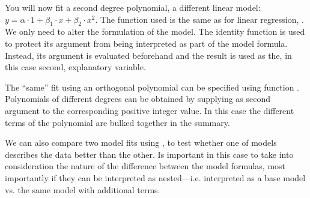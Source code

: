 \documentclass[krantz2]{krantz}\usepackage{knitr}%
\begin{document}
\begin{playground}
You will now fit a second degree polynomial, a different linear model: $y = \alpha \cdot 1 + \beta_1 \cdot x + \beta_2 \cdot x^2$. The function used is the same as for linear regression, . We only need to alter the formulation of the model. The identity function  is used to protect its argument from being interpreted as part of the model formula. Instead, its argument is evaluated beforehand and the result is used as the, in this case second, explanatory variable.

\begin{knitrout}\footnotesize
{}\color{fgcolor}\begin{kframe}
\begin{alltt}
 \hlkwb{<-}  \hlopt{~}  \hlopt{+} \hlopt{^}\hlstd{),}  
  \hlstd{=} \hlstd{)}
\end{alltt}
\end{kframe}
\end{knitrout}

The ``same'' fit using an orthogonal polynomial can be specified using function . Polynomials of different degrees can be obtained by supplying as second argument to  the corresponding positive integer value. In this case the different terms of the polynomial are bulked together in the summary.

\begin{knitrout}\footnotesize
{}\color{fgcolor}\begin{kframe}
\begin{alltt}
 \hlkwb{<-}  \hlopt{~}  \hlstd{),} 
\end{alltt}
\end{kframe}
\end{knitrout}

We can also compare two model fits using , to test whether one of models describes the data better than the other. Is important in this case to take into consideration the nature of the difference between the model formulas, most importantly if they can be interpreted as nested---i.e. interpreted as a base model vs. the same model with additional terms.


\end{playground}
\end{document}
